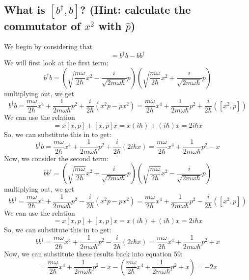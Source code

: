 \documentclass[12pt]{article}
\begin{document}
\subsection{What is \( [b^\dagger, b] \)? (Hint: calculate the commutator of \( x^2 \) with \( \hat{p} \))}
We begin by considering that
\begin{equation}
    [b^\dagger, b] = b^\dagger b - bb^\dagger
\end{equation}
We will first look at the first term:
\begin{equation}
    b^\dagger b = \left(\sqrt{\frac{m\omega}{2\hbar}}x^2 - \frac{i}{\sqrt{2m\omega\hbar}}p\right)\left(\sqrt{\frac{m\omega}{2\hbar}}x^2 + \frac{i}{\sqrt{2m\omega\hbar}}p\right)
\end{equation}
multiplying out, we get
\begin{equation}
    b^\dagger b = \frac{m\omega}{2\hbar}x^4 + \frac{1}{2m\omega\hbar}p^2 + \frac{i}{2\hbar}\left(x^{2}p- px^{2}\right) = \frac{m\omega}{2\hbar}x^4 + \frac{1}{2m\omega\hbar}p^2 + \frac{i}{2\hbar}\left([x^{2},p]\right)
\end{equation}
We can use the relation
\begin{equation}
    [x^{2},p] = x[x,p] + [x,p]x = x\left(i\hbar\right) + \left(i\hbar\right)x = 2i\hbar x
\end{equation}
So, we can substitute this in to get:
\begin{equation}
    b^\dagger b = \frac{m\omega}{2\hbar}x^4 + \frac{1}{2m\omega\hbar}p^2 + \frac{i}{2\hbar}\left(2i\hbar x\right) = \frac{m\omega}{2\hbar}x^4 + \frac{1}{2m\omega\hbar}p^2 - x
\end{equation}
Now, we consider the second term:
\begin{equation}
    bb^\dagger = \left(\sqrt{\frac{m\omega}{2\hbar}}x^2 + \frac{i}{\sqrt{2m\omega\hbar}}p\right)\left(\sqrt{\frac{m\omega}{2\hbar}}x^2 - \frac{i}{\sqrt{2m\omega\hbar}}p\right)
\end{equation}
multiplying out, we get
\begin{equation}
    bb^\dagger = \frac{m\omega}{2\hbar}x^4 + \frac{1}{2m\omega\hbar}p^2 - \frac{i}{2\hbar}\left(x^{2}p- px^{2}\right) = \frac{m\omega}{2\hbar}x^4 + \frac{1}{2m\omega\hbar}p^2 - \frac{i}{2\hbar}\left([x^{2},p]\right)
\end{equation}
We can use the relation
\begin{equation}
    [x^{2},p] = x[x,p] + [x,p]x = x\left(i\hbar\right) + \left(i\hbar\right)x = 2i\hbar x
\end{equation}
So, we can substitute this in to get:
\begin{equation}
    bb^\dagger = \frac{m\omega}{2\hbar}x^4 + \frac{1}{2m\omega\hbar}p^2 - \frac{i}{2\hbar}\left(2i\hbar x\right) = \frac{m\omega}{2\hbar}x^4 + \frac{1}{2m\omega\hbar}p^2 + x
\end{equation}
Now, we can substitute these results back into equation 59:
\begin{equation}
    [b^\dagger, b] = \frac{m\omega}{2\hbar}x^4 + \frac{1}{2m\omega\hbar}p^2 - x - \left(\frac{m\omega}{2\hbar}x^4 + \frac{1}{2m\omega\hbar}p^2 + x\right) = \boxed{-2x}
\end{equation}
\end{document}
